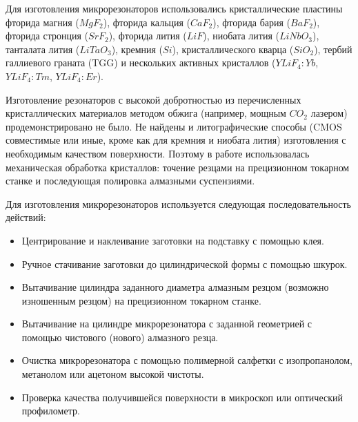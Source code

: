 Для изготовления микрорезонаторов использовались кристаллические пластины фторида магния ($MgF_2$), фторида кальция ($CaF_2$), фторида бария ($BaF_2$), фторида стронция ($SrF_2$), фторида лития ($LiF$), ниобата лития ($LiNbO_3$), танталата лития ($LiTaO_3$), кремния ($Si$), кристаллического кварца ($SiO_2$), тербий галлиевого граната (TGG) и нескольких активных кристаллов ($YLiF_4:Yb$, $YLiF_4:Tm$, $YLiF_4:Er$).

Изготовление резонаторов с высокой добротностью из перечисленных кристаллических материалов методом обжига (например, мощным $CO_2$ лазером) продемонстрировано не было. Не найдены и литографические способы (CMOS совместимые или иные, кроме как для кремния и ниобата лития) изготовления с необходимым качеством поверхности. Поэтому в работе использовалась механическая обработка кристаллов: точение резцами на прецизионном токарном станке и последующая полировка алмазными суспензиями.

Для изготовления микрорезонаторов используется следующая последовательность действий:

\begin{itemize}
  \item Центрирование и наклеивание заготовки на подставку с помощью клея.
  \item Ручное стачивание заготовки до цилиндрической формы с помощью шкурок.
  \item Вытачивание цилиндра заданного диаметра алмазным резцом (возможно изношенным резцом) на прецизионном токарном станке.
  \item Вытачивание на цилиндре микрорезонатора с заданной геометрией с помощью чистового (нового) алмазного резца.
  \item Очистка микрорезонатора с помощью полимерной салфетки с изопропанолом, метанолом или ацетоном высокой чистоты.
  \item Проверка качества получившейся поверхности в микроскоп или оптический профилометр.
\end{itemize}

